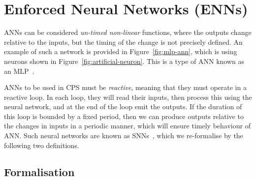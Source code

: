 \section{Enforced Neural Networks (\acp{ENN})}


\acp{ANN} can be considered \emph{un-timed non-linear} functions, 
where the outputs change relative to the inputs, but the timing of the change is not precisely defined. 
An example of such a network is provided in Figure~\ref{fig:mlp-ann},
which is using neurons shown in Figure~\ref{fig:artificial-neuron}. 
This is a type of \ac{ANN} known as an \acf{MLP}~\cite{yegnanarayana1994artificial}.

\acp{ANN} to be used
in CPS must be \emph{reactive}, meaning that they must operate in a
reactive loop.
In each loop, they will read their inputs,
then process this using the neural network, and at the end of the
loop emit the outputs. If the duration of this loop is bounded by a
fixed period, then we can produce outputs relative to the changes in
inputs in a periodic manner, which will ensure timely behaviour of
\ac{ANN}. Such neural networks are known as \acp{SNN}~\cite{sann}, which we
re-formalise by the following two definitions.


\subsection{Formalisation}

